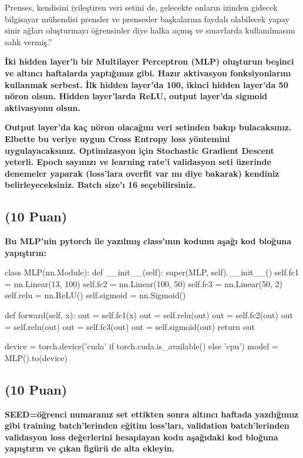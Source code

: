 \documentclass[11pt]{article}
\begin{document}
Prenses, kendisini iyileştiren veri setini de, gelecekte onların izinden gidecek bilgisayar mühendisi prensler ve prensesler başkalarına faydalı olabilecek yapay sinir ağları oluşturmayı öğrensinler diye halka açmış ve sınavlarda kullanılmasını salık vermiş.''

\textbf{İki hidden layer'lı bir Multilayer Perceptron (MLP) oluşturun beşinci ve altıncı haftalarda yaptığımız gibi. Hazır aktivasyon fonksiyonlarını kullanmak serbest. İlk hidden layer'da 100, ikinci hidden layer'da 50 nöron olsun. Hidden layer'larda ReLU, output layer'da sigmoid aktivasyonu olsun.}

\textbf{Output layer'da kaç nöron olacağını veri setinden bakıp bulacaksınız. Elbette bu veriye uygun Cross Entropy loss yöntemini uygulayacaksınız. Optimizasyon için Stochastic Gradient Descent yeterli. Epoch sayınızı ve learning rate'i validasyon seti üzerinde denemeler yaparak (loss'lara overfit var mı diye bakarak) kendiniz belirleyeceksiniz. Batch size'ı 16 seçebilirsiniz.}

\subsection{(10 Puan)} \textbf{Bu MLP'nin pytorch ile yazılmış class'ının kodunu aşağı kod bloğuna yapıştırın:}

\begin{python}
class MLP(nn.Module):
    def __init__(self):
        super(MLP, self).__init__()
        self.fc1 = nn.Linear(13, 100)
        self.fc2 = nn.Linear(100, 50)
        self.fc3 = nn.Linear(50, 2)
        self.relu = nn.ReLU()
        self.sigmoid = nn.Sigmoid()

    def forward(self, x):
      out = self.fc1(x)
      out = self.relu(out)
      out = self.fc2(out)
      out = self.relu(out)
      out = self.fc3(out)
      out = self.sigmoid(out)
      return out


device = torch.device('cuda' if torch.cuda.is_available() else 'cpu')
model = MLP().to(device)


\end{python}

\subsection{(10 Puan)} \textbf{SEED=öğrenci numaranız set ettikten sonra altıncı haftada yazdığımız gibi training batch'lerinden eğitim loss'ları, validation batch'lerinden validasyon loss değerlerini hesaplayan kodu aşağıdaki kod bloğuna yapıştırın ve çıkan figürü de alta ekleyin.}
\end{document}
